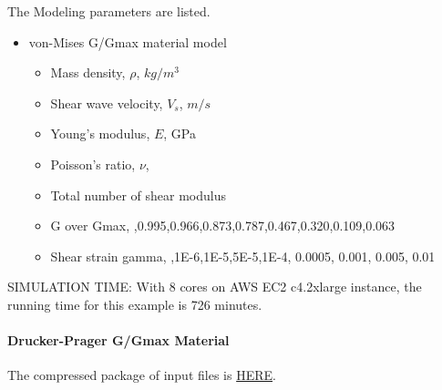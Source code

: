 The Modeling parameters are listed.
\begin{itemize}
  \item von-Mises G/Gmax material model 
  \begin{itemize}
    \item Mass density, $\rho$, \enspace {} $kg/m^3$
    \item Shear wave velocity, $V_s$, \enspace {} $m/s$
    \item Young's modulus, $E$, \enspace {} GPa
    \item Poisson's ratio, $\nu$, \enspace {}
    \item Total number of shear modulus \enspace {}
    \item G over Gmax, \enspace {},0.995,0.966,0.873,0.787,0.467,0.320,0.109,0.063
    \item Shear strain gamma, \enspace {},1E-6,1E-5,5E-5,1E-4, 0.0005, 0.001, 0.005, 0.01
  \end{itemize}
\end{itemize}

SIMULATION TIME: With 8 cores on AWS EC2 c4.2xlarge instance, the running time for this example is 726 minutes.


\paragraph{Drucker-Prager G/Gmax Material}
The compressed package of input files is  
\href{http://sokocalo.engr.ucdavis.edu/~jeremic/lecture_notes_online_material/_Chapter_Short_Course_Examples/nonlinear_analysis_steps/soil-foundation/DruckerPragerGoverGmax/_all_files_packaged_for_DruckerPragerGoverGmax.tar.gz}{HERE}. 


